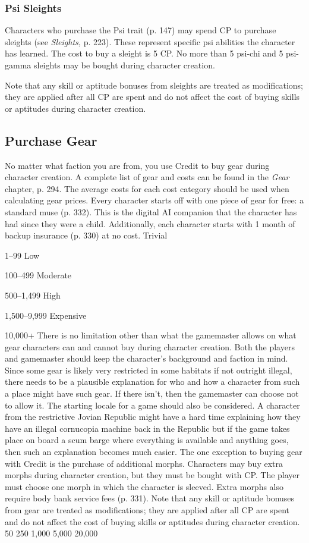 \subsubsection{Psi Sleights}

Characters who purchase the Psi trait (p. 147) may 
spend CP to purchase sleights (see \textit{Sleights,} p. 223). 
These represent specific psi abilities the character has 
learned. The cost to buy a sleight is 5 CP. No more 
than 5 psi-chi and 5 psi-gamma sleights may be bought 
during character creation.

Note that any skill or aptitude bonuses from 
sleights are treated as modifications; they are applied 
after all CP are spent and do not affect the cost of 
buying skills or aptitudes during character creation.

\subsection{Purchase Gear}

No matter what faction you are from, you use Credit 
to buy gear during character creation. A complete list 
of gear and costs can be found in the \textit{Gear} chapter, p. 
294. The average costs for each cost category should 
be used when calculating gear prices.
Every character starts off with one piece of gear 
for free: a standard muse (p. 332). This is the digital 
AI companion that the character has had since they 
were a child. Additionally, each character starts with 1 
month of backup insurance (p. 330) at no cost.
Trivial

1–99
Low

100–499
Moderate

500–1,499
High

1,500–9,999
Expensive

10,000+
There is no limitation other than what the gamemaster
allows on what gear characters can and cannot
buy during character creation. Both the players and 
gamemaster should keep the character's background 
and faction in mind. Since some gear is likely very 
restricted in some habitats if not outright illegal, there 
needs to be a plausible explanation for who and how 
a character from such a place might have such gear. 
If there isn't, then the gamemaster can choose not to 
allow it. The starting locale for a game should also 
be considered. A character from the restrictive Jovian 
Republic might have a hard time explaining how they 
have an illegal cornucopia machine back in the Republic
but if the game takes place on board a scum
barge where everything is available and anything goes, 
then such an explanation becomes much easier.
The one exception to buying gear with Credit is 
the purchase of additional morphs. Characters may 
buy extra morphs during character creation, but they 
must be bought with CP. The player must choose 
one morph in which the character is sleeved. Extra 
morphs also require body bank service fees (p. 331).
Note that any skill or aptitude bonuses from gear 
are treated as modifications; they are applied after 
all CP are spent and do not affect the cost of buying 
skills or aptitudes during character creation.
50
250
1,000
5,000
20,000


